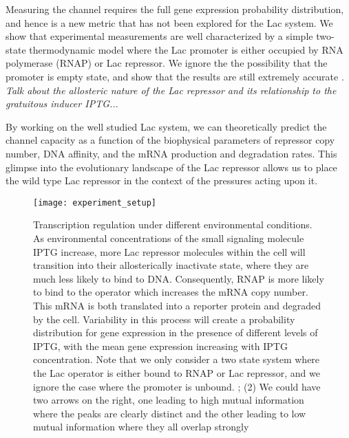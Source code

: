 Measuring the channel requires the full gene expression probability
distribution, and hence is a new metric that has not been explored for the Lac
system. We show that experimental measurements are well characterized by a simple two-state thermodynamic model where the Lac promoter is either occupied by RNA polymerase (RNAP) or Lac repressor. We ignore the the possibility that the promoter is empty state, and show that the results are still extremely accurate . \textit{Talk about the allosteric nature of the Lac repressor and its relationship to the gratuitous inducer IPTG...}

By working on the well studied Lac system, we can theoretically predict the channel capacity as a function of the biophysical parameters of repressor copy number, DNA affinity, and the mRNA production and degradation rates. This glimpse into the evolutionary landscape of the Lac repressor allows us to place the wild type Lac repressor in the context of the pressures acting upon it.

\begin{figure}[h!]
	\centering \texttt{[image: experiment\_setup]} \caption{Transcription
		regulation under different environmental conditions. As environmental
		concentrations of the small signaling molecule IPTG increase, more Lac
		repressor molecules within the cell will transition into their allosterically
		inactivate state, where they are much less likely to bind to DNA. Consequently,
		RNAP is more likely to bind to the operator which increases the mRNA copy
		number. This mRNA is both translated into a reporter protein and degraded by
		the cell. Variability in this process will create a probability distribution
		for gene expression in the presence of different levels of IPTG, with the mean
		gene expression increasing with IPTG concentration. Note that we only consider
		a two state system where the Lac operator is either bound to RNAP or Lac
		repressor, and we ignore the case where the promoter is unbound. ; (2) We could have two arrows on the right, one leading to high mutual information where the peaks are clearly distinct and the other leading to low mutual information where they all overlap strongly}
	\label{figExpSetup}
\end{figure}


